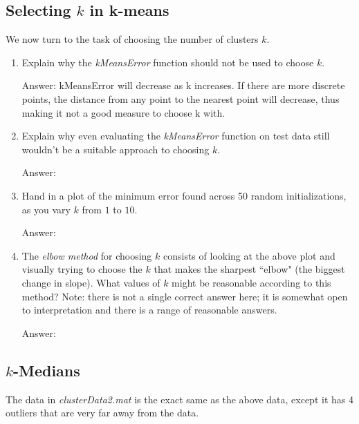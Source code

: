 \documentclass{article}
\def\ans#1{\par\gre{Answer: #1}}
\def\blu#1{{\color{blu}#1}}
\def\gre#1{{\color{gre}#1}}
\def\enum#1{\begin{enumerate}#1\end{enumerate}}
\begin{document}
 \pagebreak

 \subsection{Selecting $k$ in k-means}

 We now turn to the task of choosing the number of clusters $k$.

 \blu{\enum{
 \item Explain why the \emph{kMeansError} function should not be used to choose $k$.
\ans{kMeansError will decrease as k increases. If there are more discrete points, the distance from any point to the nearest point will decrease, thus making it not a good measure to choose k with.}
 \item Explain why even evaluating the \emph{kMeansError} function on test data still wouldn't be a suitable approach to choosing $k$.
\ans{}
 \item Hand in a plot of the minimum error found across 50 random initializations, as you vary $k$ from $1$ to $10$.
\ans{}
 \item The \emph{elbow method} for choosing $k$ consists of looking at the above plot and visually trying to choose the $k$ that makes the sharpest ``elbow" (the biggest change in slope). What values of $k$ might be reasonable according to this method? Note: there is not a single correct answer here; it is somewhat open to interpretation and there is a range of reasonable answers.
\ans{}
 }}

 \pagebreak

 \subsection{$k$-Medians}

 The data in \emph{clusterData2.mat} is the exact same as the above data, except it has 4 outliers that are very far away from the data.
\end{document}
